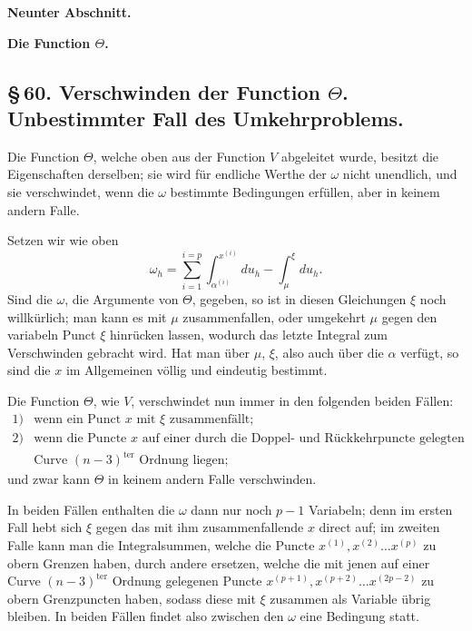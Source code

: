 \documentclass[10pt]{article}
\begin{document}
\begin{center}
{\bfseries Neunter Abschnitt.}\par\vspace{0.6em}
{\Large\bfseries Die Function \(\Theta\).}
\end{center}

\subsection*{\S\,60. Verschwinden der Function \(\Theta\). Unbestimmter Fall des Umkehrproblems.}

Die Function \(\Theta\), welche oben aus der Function \(V\) abgeleitet wurde, besitzt die Eigenschaften derselben; sie wird für endliche Werthe der \(\omega\) nicht unendlich, und sie verschwindet, wenn die \(\omega\) bestimmte Bedingungen erfüllen, aber in keinem andern Falle.

Setzen wir wie oben
\[
\tag{1}
\omega_h=\sum_{i=1}^{i=p}\int_{\alpha^{(i)}}^{x^{(i)}}du_h-\int_{\mu}^{\xi}du_h .
\]
Sind die \(\omega\), die Argumente von \(\Theta\), gegeben, so ist in diesen Gleichungen \(\xi\) noch willkürlich; man kann es mit \(\mu\) zusammenfallen, oder umgekehrt \(\mu\) gegen den variabeln Punct \(\xi\) hinrücken lassen, wodurch das letzte Integral zum Verschwinden gebracht wird. Hat man über \(\mu\), \(\xi\), also auch über die \(\alpha\) verfügt, so sind die \(x\) im Allgemeinen völlig und eindeutig bestimmt.

Die Function \(\Theta\), wie \(V\), verschwindet nun immer in den folgenden beiden Fällen:
\[
\begin{array}{ll}
1) & \text{wenn ein Punct }x\text{ mit }\xi\text{ zusammenfällt;}\\
2) & \text{wenn die Puncte }x\text{ auf einer durch die Doppel- und Rückkehrpuncte gelegten}\\
   & \text{Curve }(n-3)^{\mathrm{ter}}\text{ Ordnung liegen;}
\end{array}
\]
und zwar kann \(\Theta\) in keinem andern Falle verschwinden.

In beiden Fällen enthalten die \(\omega\) dann nur noch \(p-1\) Variabeln; denn im ersten Fall hebt sich \(\xi\) gegen das mit ihm zusammenfallende \(x\) direct auf; im zweiten Falle kann man die Integralsummen, welche die Puncte \(x^{(1)},x^{(2)}\ldots x^{(p)}\) zu obern Grenzen haben, durch andere ersetzen, welche die mit jenen auf einer Curve \((n-3)^{\mathrm{ter}}\) Ordnung gelegenen Puncte \(x^{(p+1)},x^{(p+2)}\ldots x^{(2p-2)}\) zu obern Grenzpuncten haben, sodass diese mit \(\xi\) zusammen als Variable übrig bleiben. In beiden Fällen findet also zwischen den \(\omega\) eine Bedingung statt.
\end{document}
